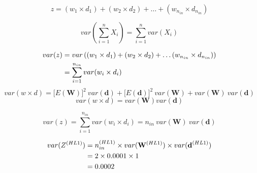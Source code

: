 \documentclass[xcolor={table}]{beamer}
\begin{document}
 \begin{frame} 
\begin{equation}
z= \left( w_1 \times  d_{1} \right) + \left( w_2 \times  d_{2} \right) + \dots + \left( w_{n_{in}} \times  d_{n_{in}} \right) 
\end{equation}
\end{frame} 



 \begin{frame} 
\begin{equation}
var\left( \sum_{i=1}^n X_i \right) = \sum_{i=1}^n var\left(X_i\right)
\label{eq:bienaymeformula}
\end{equation}
\end{frame} 



 \begin{frame} 
\begin{alignat}{1}
var(z)&= var\left(\left( w_1 \times  d_{1} \right) + \left( w_2 \times  d_{2} \right) + \dots \left( w_{n_{in}} \times  d_{n_{in}} \right) \right)\notag \\
&= \sum_{i=1}^{n_{in}} var(w_i \times d_{i})
\end{alignat}
\begin{equation}
var(w \times d) = \lbrack E(\textbf{W})\rbrack^2~var(\textbf{d}) + \lbrack E(\textbf{d})\rbrack^2~var(\mathbf{W}) + var(\mathbf{W})~var(\textbf{d})
\label{eq:varweightsinputs}
\end{equation}
\begin{equation}
var(w \times d) = var(\mathbf{W}) var(\textbf{d})
\end{equation}
\end{frame} 



 \begin{frame} 
\begin{equation}
var(z)= \sum_{i=1}^{n_{in}} var(w_i \times d_{i}) = n_{in}~var(\mathbf{W})~var(\textbf{d})
\label{eq:varz}
\end{equation}
\end{frame} 



 \begin{frame} 
\begin{alignat}{2}
var(Z^{(HL1)}) & =  n_{in}^{(HL1)} \times var(\mathbf{W}^{(HL1)}) \times var(\textbf{d}^{(HL1)})\\ \notag
& = 2 \times 0.0001 \times 1\\ \notag
& = 0.0002
\label{eq:varzexample}
\end{alignat}
\end{frame} 
\end{document}
